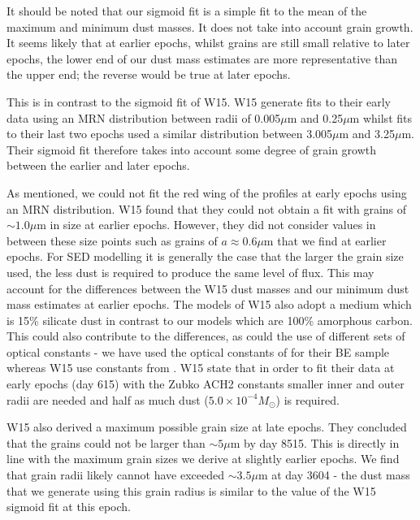 \documentclass[useAMS,usenatbib,usegraphicx]{mnras}
\begin{document}
It should be noted that our sigmoid fit is a simple fit to the mean of the maximum and minimum dust masses.  It does not take into account grain growth.  It seems likely that at earlier epochs, whilst grains are still small relative to later epochs, the lower end of our  dust mass estimates are more representative than the upper end; the reverse would be true at later epochs.

This is in contrast to the sigmoid fit of W15.  W15 generate fits to their early data using an MRN 
distribution between radii of 0.005$\mu$m and 0.25$\mu$m whilst fits to their last two epochs used a similar distribution between 3.005$\mu$m and 3.25$\mu$m.  Their sigmoid fit therefore takes into account some degree of grain growth between the earlier and later epochs.   

As mentioned, we could not fit the red wing of the profiles at early epochs using an MRN distribution.  W15 found that they could not 
obtain a fit with grains of $\sim 1.0 \mu$m in size at earlier epochs.  
However, they did not consider values in between these size points such as grains of $a \approx 0.6\mu$m that we find at earlier epochs.  For 
SED modelling it is generally the case that the larger the grain size 
used, the less dust is required to produce the same level of flux.  This may account for the differences between the W15 dust masses and our minimum dust mass estimates at earlier epochs.  The models of W15 also adopt a medium which is 15\% silicate dust in contrast to our models which are 100\% amorphous carbon.  This could also contribute to the differences, as could the use of different sets of optical constants - we have used the optical constants of \cite{Zubko1996} for their BE sample whereas W15 use constants from 
\cite{Hanner1988}.  W15 state that in order to 
fit their data at early epochs (day 615) with the Zubko ACH2 constants 
smaller inner and outer radii are needed and half as much dust ($5.0 
\times 10^{-4}M_{\odot}$) is required.  

W15 also derived a maximum possible grain size at 
late epochs.  They concluded that the grains could not be larger than $\sim 
5\mu$m by day 8515.  This is directly in line with the maximum grain sizes 
we derive at slightly earlier epochs.  We find that grain radii likely 
cannot have exceeded $\sim 3.5\mu$m at day 3604 - the dust mass that 
we generate using this grain radius is  similar to the value of the W15 
sigmoid fit at this epoch.
\end{document}
